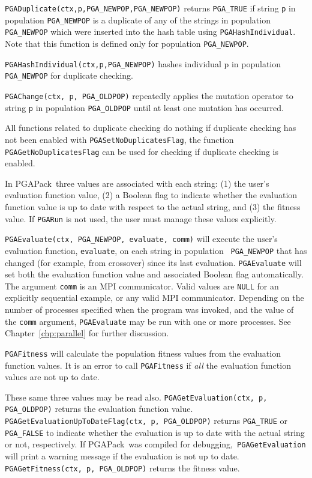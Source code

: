 \documentclass{report}
\newcommand{\pga}{PGAPack}
\begin{document}
\verb+PGADuplicate(ctx,p,PGA_NEWPOP,PGA_NEWPOP)+ returns \verb+PGA_TRUE+
if string \verb+p+ in population \verb+PGA_NEWPOP+ is a duplicate of any
of the strings in population \verb+PGA_NEWPOP+ which were inserted into
the hash table using \verb+PGAHashIndividual+. Note that this function
is defined only for population \verb+PGA_NEWPOP+.

\verb+PGAHashIndividual(ctx,p,PGA_NEWPOP)+ hashes individual p in
population \verb+PGA_NEWPOP+ for duplicate checking.

\verb+PGAChange(ctx, p, PGA_OLDPOP)+ repeatedly applies the mutation
operator to string \verb+p+ in population \verb+PGA_OLDPOP+ until at
least one mutation has occurred.

All functions related to duplicate checking do nothing if duplicate
checking has not been enabled with \verb+PGASetNoDuplicatesFlag+, the
function \verb+PGAGetNoDuplicatesFlag+ can be used for checking if
duplicate checking is enabled.

In \pga\ three  values are associated with each string: (1) the user's
evaluation function value, (2) a Boolean flag to indicate whether the
evaluation function value is up to date with respect to the actual string, and
(3) the fitness value.  If {\tt PGARun} is not used, the user must manage
these values explicitly.

\begin{sloppypar}
{\tt PGAEvaluate(ctx, PGA\_NEWPOP, evaluate, comm)} will execute the user's
evaluation function, {\tt evaluate}, on each string in population {\tt
PGA\_NEWPOP} that has changed (for example, from crossover) since its last
evaluation.  {\tt PGAEvaluate} will set both the evaluation function value and
associated Boolean flag automatically.  The argument {\tt comm} is an MPI
communicator.  Valid values are {\tt NULL} for an explicitly sequential
example, or any valid MPI communicator.  Depending on the number of processes
specified when the program was invoked, and the value of the {\tt comm}
argument, {\tt PGAEvaluate} may be run with one or more processes.  See
Chapter~\ref{chp:parallel} for further discussion.
\end{sloppypar}

{\tt PGAFitness} will calculate the population fitness values from the
evaluation function values.  It is an error to call {\tt PGAFitness} if {\em
all} the evaluation function values are not up to date.

These same three values may be read also.  {\tt PGAGetEvaluation(ctx, p,
PGA\_OLDPOP)} returns the evaluation function value. {\tt
PGAGetEvaluationUpToDateFlag(ctx, p, PGA\_OLDPOP)} returns {\tt PGA\_TRUE} or
{\tt PGA\_FALSE} to indicate whether the evaluation is up to date with the
actual string or not, respectively.  If \pga\ was compiled for debugging,{\tt
PGAGetEvaluation} will print a warning message if the evaluation is not up to
date.  {\tt PGAGetFitness(ctx, p, PGA\_OLDPOP)} returns the fitness value.
\end{document}
